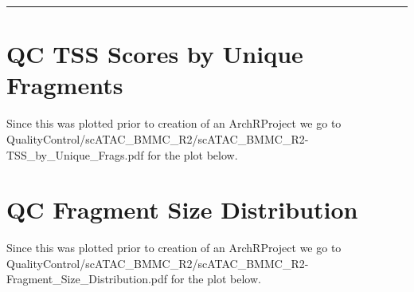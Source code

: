 \documentclass[
  12pt,
]{krantz}
\begin{document}
\begin{center}\rule{0.5\linewidth}{0.5pt}\end{center}

\hypertarget{qc-tss-scores-by-unique-fragments}{%
\section{QC TSS Scores by Unique Fragments}\label{qc-tss-scores-by-unique-fragments}}

Since this was plotted prior to creation of an ArchRProject we go to QualityControl/scATAC\_BMMC\_R2/scATAC\_BMMC\_R2-TSS\_by\_Unique\_Frags.pdf for the plot below.

\hypertarget{qc-fragment-size-distribution}{%
\section{QC Fragment Size Distribution}\label{qc-fragment-size-distribution}}

Since this was plotted prior to creation of an ArchRProject we go to QualityControl/scATAC\_BMMC\_R2/scATAC\_BMMC\_R2-Fragment\_Size\_Distribution.pdf for the plot below.
\end{document}
